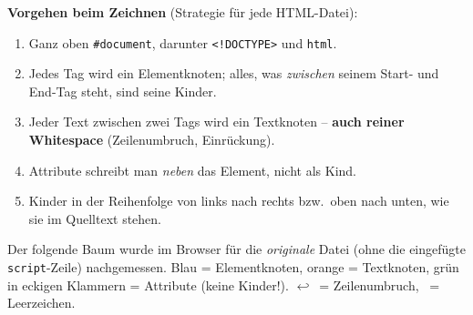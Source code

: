\documentclass[a4paper,11pt]{article}
\newcommand{\nl}{\ensuremath{\hookleftarrow}}
\newcommand{\ws}{\textvisiblespace}
\begin{document}
\textbf{Vorgehen beim Zeichnen} (Strategie für jede HTML-Datei):
\begin{merkbox}[title={Strategie: DOM-Baum zeichnen}]
\begin{enumerate}[nosep]
\item Ganz oben \texttt{\#document}, darunter \texttt{<!DOCTYPE>} und \texttt{html}.
\item Jedes Tag wird ein Elementknoten; alles, was \emph{zwischen} seinem Start- und End-Tag steht, sind seine Kinder.
\item Jeder Text zwischen zwei Tags wird ein Textknoten -- \textbf{auch reiner Whitespace} (Zeilenumbruch, Einrückung).
\item Attribute schreibt man \emph{neben} das Element, nicht als Kind.
\item Kinder in der Reihenfolge von links nach rechts bzw.\ oben nach unten, wie sie im Quelltext stehen.
\end{enumerate}
\end{merkbox}

Der folgende Baum wurde im Browser für die \emph{originale} Datei (ohne die eingefügte \texttt{script}-Zeile)
nachgemessen. Blau = Elementknoten, orange = Textknoten, grün in eckigen Klammern = Attribute (keine Kinder!).
\nl\ = Zeilenumbruch, \ws\ = Leerzeichen.
\end{document}
